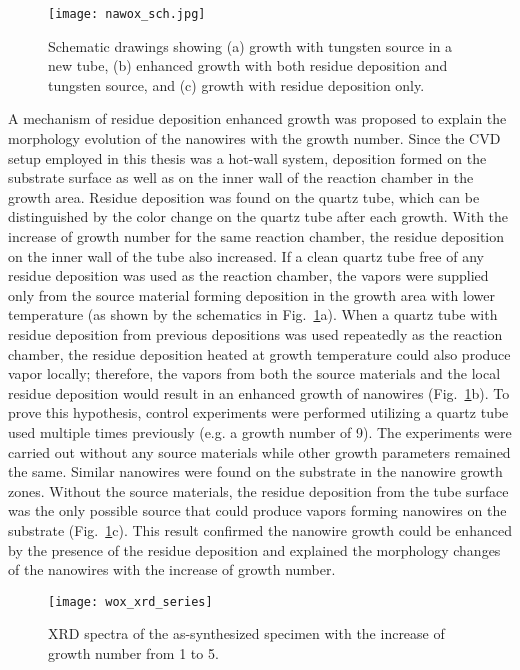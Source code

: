 \begin{figure}[htb]
\centering
\texttt{[image: nawox\_sch.jpg]}
\caption[Schematic drawings of residual sodium tungsten oxides growth]{Schematic drawings showing (a) growth with tungsten source in a new tube, (b) enhanced growth with both residue deposition and tungsten source, and (c) growth with residue deposition only.}
\label{fig:nawoxsch}
\end{figure}

A mechanism of residue deposition enhanced growth was proposed to explain the morphology evolution of the nanowires with the growth number. Since the CVD setup employed in this thesis was a hot-wall system, deposition formed on the substrate surface as well as on the inner wall of the reaction chamber in the growth area. Residue deposition was found on the quartz tube, which can be distinguished by the color change on the quartz tube after each growth. With the increase of growth number for the same reaction chamber, the residue deposition on the inner wall of the tube also increased. If a clean quartz tube free of any residue deposition was used as the reaction chamber, the vapors were supplied only from the source material forming deposition in the growth area with lower temperature (as shown by the schematics in Fig.~\ref{fig:nawoxsch}a). When a quartz tube with residue deposition from previous depositions was used repeatedly as the reaction chamber, the residue deposition heated at growth temperature could also produce vapor locally; therefore, the vapors from both the source materials and the local residue deposition would result in an enhanced growth of nanowires (Fig.~\ref{fig:nawoxsch}b). To prove this hypothesis, control experiments were performed utilizing a quartz tube used multiple times previously (e.g. a growth number of 9). The experiments were carried out without any source materials while other growth parameters remained the same. Similar nanowires were found on the substrate in the nanowire growth zones. Without the source materials, the residue deposition from the tube surface was the only possible source that could produce vapors forming nanowires on the substrate (Fig.~\ref{fig:nawoxsch}c). This result confirmed the nanowire growth could be enhanced by the presence of the residue deposition and explained the morphology changes of the nanowires with the increase of growth number.
\begin{figure}[htb]
\centering
\texttt{[image: wox\_xrd\_series]}
\caption[XRD spectra of the as-synthesized specimen with the increase of growth number from 1 to 5]{XRD spectra of the as-synthesized specimen with the increase of growth number from 1 to 5.}
\label{fig:nawoxxrd}
\end{figure}

